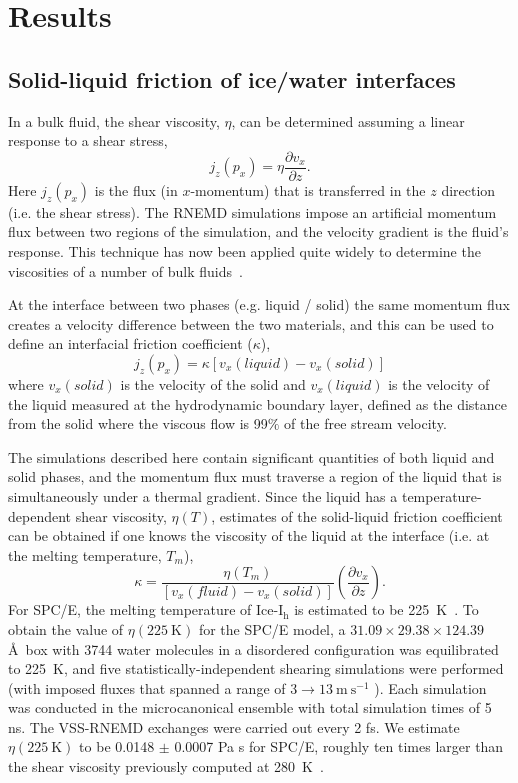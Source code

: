 \documentclass[aps,jcp,preprint,showpacs,superscriptaddress,groupedaddress]{revtex4}  %
\begin{document}
\section{Results}

\subsection{Solid-liquid friction of ice/water interfaces}
In a bulk fluid, the shear viscosity, $\eta$, can be determined
assuming a linear response to a shear stress,
\begin{equation}\label{Shenyu-11}
j_{z}(p_{x}) = \eta \frac{\partial v_{x}}{\partial z}.
\end{equation}
Here $j_{z}(p_{x})$ is the flux (in $x$-momentum) that is transferred
in the $z$ direction (i.e. the shear stress). The RNEMD simulations
impose an artificial momentum flux between two regions of the
simulation, and the velocity gradient is the fluid's response. This
technique has now been applied quite widely to determine the
viscosities of a number of bulk fluids~\cite{Muller99,Bordat02,Cavalcanti07}.

At the interface between two phases (e.g. liquid / solid) the same
momentum flux creates a velocity difference between the two materials,
and this can be used to define an interfacial friction coefficient
($\kappa$),
\begin{equation}\label{Shenyu-13}
j_{z}(p_{x}) = \kappa \left[ v_{x}(liquid) - v_{x}(solid) \right]
\end{equation}
where $v_{x}(solid)$ is the velocity of the solid and $v_{x}(liquid)$
is the velocity of the liquid measured at the hydrodynamic boundary
layer, defined as the distance from the solid where the viscous flow is 
99$\%$ of the free stream velocity.

The simulations described here contain significant quantities of both
liquid and solid phases, and the momentum flux must traverse a region
of the liquid that is simultaneously under a thermal gradient.  Since
the liquid has a temperature-dependent shear viscosity, $\eta(T)$,
estimates of the solid-liquid friction coefficient can be obtained if
one knows the viscosity of the liquid at the interface (i.e. at the
melting temperature, $T_m$),
\begin{equation}\label{kappa-2}
\kappa = \frac{\eta(T_{m})}{\left[v_{x}(fluid)-v_{x}(solid)\right]}\left(\frac{\partial v_{x}}{\partial z}\right).
\end{equation}
For SPC/E, the melting temperature of Ice-I$_\mathrm{h}$ is estimated
to be 225~K~\cite{Bryk02}.  To obtain the value of
$\eta(225\mathrm{~K})$ for the SPC/E model, a $31.09 \times 29.38
\times 124.39$ \AA\ box with 3744 water molecules in a disordered
configuration was equilibrated to 225~K, and five
statistically-independent shearing simulations were performed (with
imposed fluxes that spanned a range of $3 \rightarrow 13
\mathrm{~m~s}^{-1}$ ).  Each simulation was conducted in the
microcanonical ensemble with total simulation times of 5 ns. The
VSS-RNEMD exchanges were carried out every 2 fs. We estimate
$\eta(225\mathrm{~K})$ to be 0.0148 $\pm$ 0.0007 Pa s for SPC/E,
roughly ten times larger than the shear viscosity previously computed
at 280~K~\cite{Kuang12}.
\end{document}
